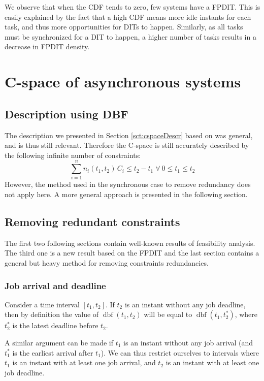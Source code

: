 \documentclass[conference]{IEEEtran}
\newcommand{\dbf}[1]{\operatorname{dbf}(#1)}
\begin{document}
	We observe that when the CDF tends to zero, few systems have a FPDIT.
	This is easily explained by the fact that
	a high CDF means more idle instants for each task, and thus more opportunities
	for DITs to happen. Similarly, as all tasks must be synchronized for a DIT to
	happen, a higher number of tasks results in a decrease in FPDIT density.

\section{C-space of asynchronous systems}
\label{sct:asyncCspace}

	\subsection{Description using DBF}

		The description we presented in Section \ref{sct:cspaceDescr} based on \cite{baruah1999generalized} was general, and
		is thus still relevant. Therefore the C-space is still accurately described by
		the following infinite number of constraints:
		\begin{equation}
			\sum_{i=1}^{n} n_i(t_1, t_2)
			\, C_i \leq t_2 - t_1 \; \forall \: 0 \leq t_1 \leq t_2
		\end{equation}
		However, the method used in the synchronous case to remove redundancy does not
		apply here. A more general approach is presented in the following section.

	\subsection{Removing redundant constraints}

		The first two following sections contain well-known results of feasibility analysis.
		The third one is a new result based on the FPDIT and the last section contains a general
		but heavy method for removing constraints redundancies.

		\subsubsection{Job arrival and deadline}
			Consider a time interval $[t_1, t_2]$. If $t_2$ is an instant without any
			job deadline, then by definition the value of $\dbf{t_1, t_2}$ will be equal to
			$\dbf{t_1, t_2^*}$, where $t_2^*$ is the latest deadline before $t_2$.

			A similar argument can be made if $t_1$ is an instant without any job arrival
			(and $t_1^*$ is the earliest arrival after $t_1$). We can thus restrict
			ourselves to intervals where $t_1$ is an instant with at least one job
			arrival, and $t_2$ is an instant with at least one job deadline.
\end{document}
